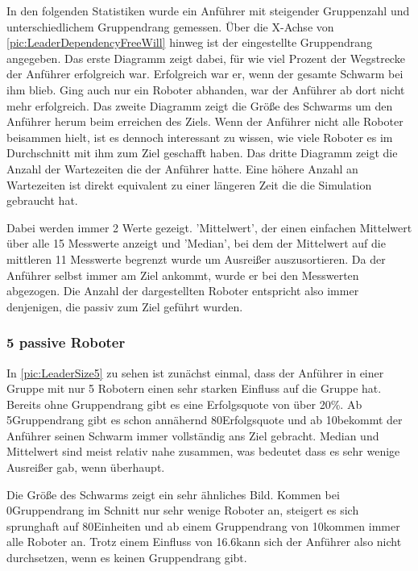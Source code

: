 In den folgenden Statistiken wurde ein Anführer mit steigender Gruppenzahl und unterschiedlichem Gruppendrang gemessen. Über die X-Achse von \autoref{pic:LeaderDependencyFreeWill} hinweg ist der eingestellte Gruppendrang angegeben.
Das erste Diagramm zeigt dabei, für wie viel Prozent der Wegstrecke der Anführer erfolgreich war. Erfolgreich war er, wenn der gesamte Schwarm bei ihm blieb. Ging auch nur ein Roboter abhanden, war der Anführer ab dort nicht mehr erfolgreich.
Das zweite Diagramm zeigt die Größe des Schwarms um den Anführer herum beim erreichen des Ziels. Wenn der Anführer nicht alle Roboter beisammen hielt, ist es dennoch interessant zu wissen, wie viele Roboter es im Durchschnitt mit ihm zum Ziel geschafft haben.
Das dritte Diagramm zeigt die Anzahl der Wartezeiten die der Anführer hatte. Eine höhere Anzahl an Wartezeiten ist direkt equivalent zu einer längeren Zeit die die Simulation gebraucht hat.

Dabei werden immer 2 Werte gezeigt. 'Mittelwert', der einen einfachen Mittelwert über alle 15 Messwerte anzeigt und 'Median', bei dem der Mittelwert auf die mittleren 11 Messwerte begrenzt wurde um Ausreißer auszusortieren. Da der Anführer selbst immer am Ziel ankommt, wurde er bei den Messwerten abgezogen. Die Anzahl der dargestellten Roboter entspricht also immer denjenigen, die passiv zum Ziel geführt wurden.

\subsubsection*{5 passive Roboter}

\newcommand{\sectionLeaderPictureWidth}{7.5cm}
\newcommand{\sectionLeaderPictureHeight}{3.5cm}

In \autoref{pic:LeaderSize5} zu sehen ist zunächst einmal, dass der Anführer in einer Gruppe mit nur 5 Robotern einen sehr starken Einfluss auf die Gruppe hat. Bereits ohne Gruppendrang gibt es eine Erfolgsquote von über 20\%. Ab 5\per Gruppendrang gibt es schon annähernd 80\per Erfolgsquote und ab 10\per bekommt der Anführer seinen Schwarm immer vollständig ans Ziel gebracht. Median und Mittelwert sind meist relativ nahe zusammen, was bedeutet dass es sehr wenige Ausreißer gab, wenn überhaupt.

Die Größe des Schwarms zeigt ein sehr ähnliches Bild. Kommen bei 0\per Gruppendrang im Schnitt nur sehr wenige Roboter an, steigert es sich sprunghaft auf 80\per Einheiten und ab einem Gruppendrang von 10\per kommen immer alle Roboter an. Trotz einem Einfluss von 16.6\per kann sich der Anführer also nicht durchsetzen, wenn es keinen Gruppendrang gibt.

